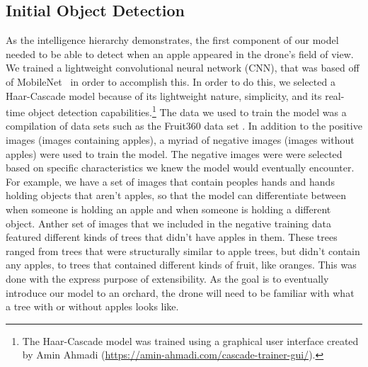 \subsection{Initial Object Detection}
As the intelligence hierarchy demonstrates, the first component of our model needed to be able to detect when an apple appeared in the drone's field of view. 
We trained a lightweight convolutional neural network (CNN), that was based off of MobileNet~\cite{Sandler2018,PyTorchMobileNet} in order to accomplish this. 
In order to do this, we selected a Haar-Cascade model because of its lightweight nature, simplicity, and its real-time object detection capabilities.\footnote{The Haar-Cascade model was trained using a graphical user interface created by Amin Ahmadi (\url{https://amin-ahmadi.com/cascade-trainer-gui/}).} 
The data we used to train the model was a compilation of data sets such as the Fruit360 data set \cite{Fruit360}.
In addition to the positive images (images containing apples), a myriad of negative images (images without apples) were used to train the model.
The negative images were were selected based on specific characteristics we knew the model would eventually encounter. 
For example, we have a set of images that contain peoples hands and hands holding objects that aren't apples, so that the model can differentiate between when someone is holding an apple and when someone is holding a different object.
Anther set of images that we included in the negative training data featured different kinds of trees that didn't have apples in them.
These trees ranged from trees that were structurally similar to apple trees, but didn't contain any apples, to trees that contained different kinds of fruit, like oranges.
This was done with the express purpose of extensibility.
As the goal is to eventually introduce our model to an orchard, the drone will need to be familiar with what a tree with or without apples looks like.
